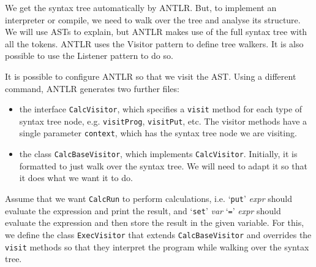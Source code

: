 \documentclass[a4paper, openany]{memoir}
\begin{document}
We get the syntax tree automatically by ANTLR. But, to implement an interpreter or compile, we need to walk over the tree and analyse its structure. We will use ASTs to explain, but ANTLR makes use of the full syntax tree with all the tokens. ANTLR uses the Visitor pattern to define tree walkers. It is also possible to use the Listener pattern to do so.

It is possible to configure ANTLR so that we visit the AST. Using a different command, ANTLR generates two further files:
\begin{itemize}
    \item the interface \texttt{CalcVisitor}, which specifies a \texttt{visit} method for each type of syntax tree node, e.g. \texttt{visitProg}, \texttt{visitPut}, etc. The visitor methods have a single parameter \texttt{context}, which has the syntax tree node we are visiting.
    \item the class \texttt{CalcBaseVisitor}, which implements \texttt{CalcVisitor}. Initially, it is formatted to just walk over the syntax tree. We will need to adapt it so that it does what we want it to do.
\end{itemize}

Assume that we want \texttt{CalcRun} to perform calculations, i.e. `\texttt{put}' \textit{expr} should evaluate the expression and print the result, and `\texttt{set}' \textit{var} `\texttt{=}' \textit{expr} should evaluate the expression and then store the result in the given variable. For this, we define the class \texttt{ExecVisitor} that extends \texttt{CalcBaseVisitor} and overrides the \texttt{visit} methods so that they interpret the program while walking over the syntax tree.
\end{document}
